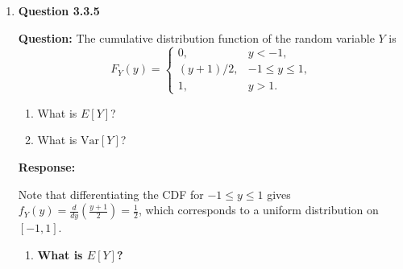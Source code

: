 \documentclass[12pt]{article}
\begin{document}
\begin{enumerate}[label=\textbf{\arabic*.}, leftmargin=*]
\begin{enumerate}[label=(\alph*)]
    \textbf{Answer:}
    $h(E[X]) = 1/\sqrt{5}$
    $E[h(X)] = 0.5$

    \item \textbf{Find $E[Y]$ and $\text{Var}[Y]$.}

    Since $Y = h(X)$, $E[Y]$ is the same as $E[h(X)]$ calculated above.

    1. \textbf{Calculate $E[Y]$:}
    \[ E[Y] = 0.5 \]

    2. \textbf{Calculate $\text{Var}[Y]$:}
    Use the formula $\text{Var}[Y] = E[Y^2] - (E[Y])^2$.
    First, find $E[Y^2]$. Note that $Y^2 = (1/\sqrt{X})^2 = 1/X$.
    \[ E[Y^2] = E[1/X] = \int_{1}^{9} \frac{1}{x} \cdot \frac{1}{8} \, dx \]
    \[ = \frac{1}{8} \left[ \ln(x) \right]_{1}^{9} \]
    \[ = \frac{1}{8} (\ln(9) - \ln(1)) \]
    Since $\ln(1) = 0$:
    \[ E[Y^2] = \frac{\ln(9)}{8} \]

    Now substitute back into the variance formula:
    \[ \text{Var}[Y] = \frac{\ln(9)}{8} - (0.5)^2 \]
    \[ \text{Var}[Y] = \frac{\ln(9)}{8} - 0.25 \]
    (Using approximations: $\ln(9) \approx 2.197$, so $E[Y^2] \approx 0.2746$. $\text{Var}[Y] \approx 0.2746 - 0.25 = 0.0246$)

    \textbf{Answer:}
    $E[Y] = 0.5$
    $\text{Var}[Y] = \frac{\ln(9)}{8} - \frac{1}{4}$
\end{enumerate}

\newpage
\item \textbf{Question 3.3.5}

\textbf{Question:} The cumulative distribution function of the random variable $Y$ is
\[
F_Y(y) = \begin{cases}
0, & y < -1, \\
(y+1)/2, & -1 \le y \le 1, \\
1, & y > 1.
\end{cases}
\]
\begin{enumerate}[label=(\alph*)]
    \item What is $E[Y]$?
    \item What is $\text{Var}[Y]$?
\end{enumerate}

\vspace{0.3in}

\textbf{Response:}

Note that differentiating the CDF for $-1 \le y \le 1$ gives $f_Y(y) = \frac{d}{dy}(\frac{y+1}{2}) = \frac{1}{2}$, which corresponds to a uniform distribution on $[-1, 1]$.

\begin{enumerate}[label=(\alph*)]
    \item \textbf{What is $E[Y]$?}


\end{enumerate}
\end{enumerate}
\end{document}
